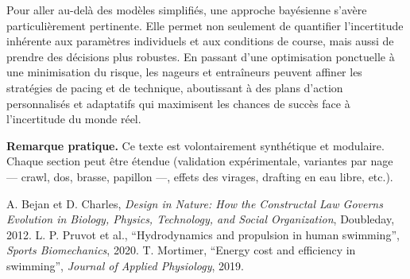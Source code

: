 \documentclass[12pt,a4paper]{article}
\begin{document}
Pour aller au-delà des modèles simplifiés, une approche bayésienne s'avère particulièrement pertinente. Elle permet non seulement de quantifier l'incertitude inhérente aux paramètres individuels et aux conditions de course, mais aussi de prendre des décisions plus robustes. En passant d'une optimisation ponctuelle à une minimisation du risque, les nageurs et entraîneurs peuvent affiner les stratégies de pacing et de technique, aboutissant à des plans d'action personnalisés et adaptatifs qui maximisent les chances de succès face à l'incertitude du monde réel.

\bigskip
\noindent\textbf{Remarque pratique.} Ce texte est volontairement synthétique et modulaire. Chaque section peut être étendue (validation expérimentale, variantes par nage — crawl, dos, brasse, papillon —, effets des virages, drafting en eau libre, etc.).




\begin{thebibliography}{9}
 A. Bejan et D. Charles, \emph{Design in Nature: How the Constructal Law Governs Evolution in Biology, Physics, Technology, and Social Organization}, Doubleday, 2012.
 L. P. Pruvot et al., ``Hydrodynamics and propulsion in human swimming'', \emph{Sports Biomechanics}, 2020.
 T. Mortimer, ``Energy cost and efficiency in swimming'', \emph{Journal of Applied Physiology}, 2019.
\end{thebibliography}
\end{document}

